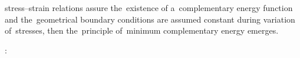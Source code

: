 

\label{para:principleofminimumcomplementaryenergy}

\vspace{.2em}\begin{changemargin}{\parindent}{\parindent}
\small
{}


stress\hbox{--}strain relations assure the~existence of a~complementary energy function and the~geometrical boundary conditions are assumed constant during variation of~stresses, then the~principle of~minimum complementary energy emerges.
\par
\nopagebreak\vspace{.2em}
\end{changemargin}

     :

